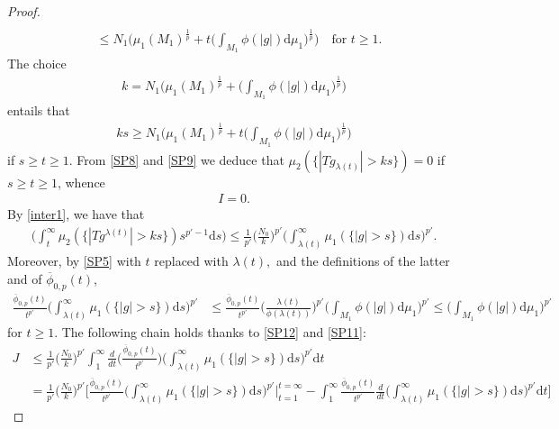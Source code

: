 \documentclass[leqno,11pt]{amsart}%
\numberwithin{equation}{section}
\def\d{\mathrm{d}}
\theoremstyle{definition}
\numberwithin{equation}{section}
\begin{document}
\begin{proof}
\begin{align}
\\ \nonumber & \leq N_1\bigg(\mu_1(M_1)^{\frac 1p} + t \bigg(\int_{M_1}\phi(|g|)\d \mu_1\bigg)^{\frac 1p}\bigg) \quad \text{for $t \geq 1$.} 
   \end{align}
   The choice
   \begin{align}\label{k} k= N_1 
       \bigg(\mu_1(M_1)^{\frac 1p} + \bigg(\int_{M_1}\phi(|g|)\d \mu_1\bigg)^{\frac 1p}\bigg)
   \end{align}
   entails that 
   \begin{align}
       \label{SP9}
       ks \geq N_1\bigg(\mu_1(M_1)^{\frac 1p} + t \bigg(\int_{M_1}\phi(|g|)\d \mu_1\bigg)^{\frac 1p}\bigg) 
   \end{align}
    if $s\geq t\geq 1$. From \eqref{SP8} and \eqref{SP9} we deduce that
    $\mu_2(\{|Tg_{\lambda(t)}|>ks\})=0$
    if $s\geq t\geq 1$, whence
    \begin{align}
        \label{SP10}
        I=0.
    \end{align}
    By \eqref{inter1}, we have that
\begin{align}
    \label{SP12}
\bigg(\int_t^\infty \mu_2(\{|Tg^{\lambda(t)}|>ks\})s^{p'-1}\d s\bigg)\leq  \frac{1}{p'} \Big(\frac{N_0}{k}\Big)^{p'}\bigg(\int_{\lambda (t)}^\infty \mu_1(\{|g|>s\})\d s\bigg)^{p'}.
\end{align}
Moreover, by \eqref{SP5} with $t$ replaced with $\lambda(t),$ and the 
definitions of  the latter and of  $\overline \phi_{0,p}(t)$,
    \begin{align}
        \label{SP11}
        \frac{  \overline \phi_{0,p}(t)}{t^{p'}} \bigg(\int_{\lambda (t)}^\infty \mu_1(\{|g|>s\})\d s\bigg)^{p'} & \leq \frac{\overline  \phi_{0,p}(t)}{t^{p'}}\bigg(\frac{\lambda (t)}{\phi (\lambda (t))}\bigg)^{p'} \bigg(\int_{M_1}\phi(|g|)\d \mu_1\bigg)^{p'}
\leq \bigg(\int_{M_1}\phi(|g|)\d \mu_1\bigg)^{p'}
    \end{align}
    for $t \geq 1$. 
    The following chain holds thanks to \eqref{SP12} and \eqref{SP11}:
    \begin{align}\label{SP14}
    J & \leq \frac{1}{p'} \Big(\frac{N_0}{k}\Big)^{p'}\int_1^\infty \frac{d}{dt}\bigg(\frac{\overline  \phi_{0,p}(t)}{t^{p'}} \bigg) \bigg(\int_{\lambda (t)}^\infty \mu_1(\{|g|>s\})\d s\bigg)^{p'}  \d t 
    \\ \nonumber &
    = \frac{1}{p'} \Big(\frac{N_0}{k}\Big)^{p'}\bigg[ \frac{\overline  \phi_{0,p}(t)}{t^{p'}}
    \bigg(\int_{\lambda (t)}^\infty \mu_1(\{|g|>s\})\d s\bigg)^{p'}\bigg|_{t=1}^{t=\infty} - 
    \int_1^\infty \frac{ \overline \phi_{0,p}(t)}{t^{p'}} \frac{d}{dt}\bigg(\int_{\lambda (t)}^\infty \mu_1(\{|g|>s\})\d s\bigg)^{p'}  \d t \bigg]

\end{align}
\end{proof}
\end{document}
